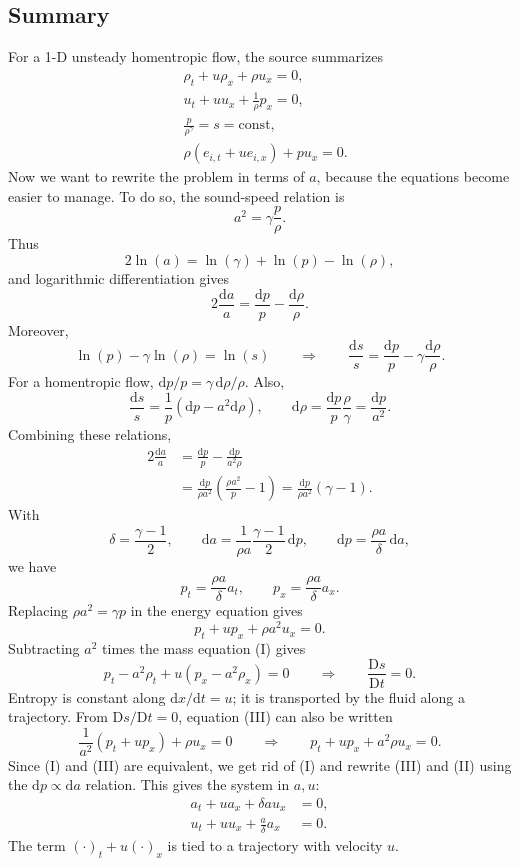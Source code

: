 \documentclass[11pt]{article}
\newcommand{\dd}{\mathrm{d}}
\begin{document}
\subsection*{Summary}
For a 1-D unsteady homentropic flow, the source summarizes
\[
\begin{aligned}
&\rho_t+u\rho_x+\rho u_x=0,\\
&u_t+u u_x+\frac{1}{\rho}p_x=0,\\
&\frac{p}{\rho^\gamma}=s=\mathrm{const},\\
&\rho(e_{i,t}+u e_{i,x})+p u_x=0.
\end{aligned}
\]
Now we want to rewrite the problem in terms of \(a\), because the equations
become easier to manage. To do so, the sound-speed relation is
\[
a^2=\gamma\frac{p}{\rho}.
\]
Thus
\[
2\ln(a)=\ln(\gamma)+\ln(p)-\ln(\rho),
\]
and logarithmic differentiation gives
\[
2\frac{\dd a}{a}=\frac{\dd p}{p}-\frac{\dd\rho}{\rho}.
\]
Moreover,
\[
\ln(p)-\gamma\ln(\rho)=\ln(s)
\qquad\Longrightarrow\qquad
\frac{\dd s}{s}=\frac{\dd p}{p}-\gamma\frac{\dd\rho}{\rho}.
\]
For a homentropic flow, \(\dd p/p=\gamma\,\dd\rho/\rho\).  Also,
\[
\frac{\dd s}{s}=\frac{1}{p}\left(\dd p-a^2\dd\rho\right),
\qquad
\dd\rho=\frac{\dd p}{p}\frac{\rho}{\gamma}
=\frac{\dd p}{a^2}.
\]
Combining these relations,
\[
\begin{aligned}
2\frac{\dd a}{a}
&=\frac{\dd p}{p}-\frac{\dd p}{a^2\rho}\\
&=\frac{\dd p}{\rho a^2}
\left(\frac{\rho a^2}{p}-1\right)
=\frac{\dd p}{\rho a^2}(\gamma-1).
\end{aligned}
\]
With
\[
\delta=\frac{\gamma-1}{2},
\qquad
\dd a=\frac{1}{\rho a}\frac{\gamma-1}{2}\,\dd p,
\qquad
\dd p=\frac{\rho a}{\delta}\,\dd a,
\]
we have
\[
p_t=\frac{\rho a}{\delta}a_t,\qquad
p_x=\frac{\rho a}{\delta}a_x.
\]
Replacing \(\rho a^2=\gamma p\) in the energy equation gives
\[
p_t+u p_x+\rho a^2u_x=0. \tag{III}
\]
Subtracting \(a^2\) times the mass equation (I) gives
\[
p_t-a^2\rho_t+u(p_x-a^2\rho_x)=0
\qquad\Longrightarrow\qquad
\frac{\mathrm{D}s}{\mathrm{D}t}=0.
\]
Entropy is constant along \(\dd x/\dd t=u\); it is transported by the fluid
along a trajectory.  From \(\mathrm{D}s/\mathrm{D}t=0\), equation (III) can
also be written
\[
\frac{1}{a^2}(p_t+u p_x)+\rho u_x=0
\qquad\Longrightarrow\qquad
p_t+u p_x+a^2\rho u_x=0. \tag{III}
\]
Since (I) and (III) are equivalent, we get rid of (I) and rewrite (III) and
(II) using the \(\dd p\propto\dd a\) relation. This gives the system in
\(a,u\):
\[
\boxed{
\begin{aligned}
a_t+u a_x+\delta a u_x&=0,\\
u_t+u u_x+\frac{a}{\delta}a_x&=0.
\end{aligned}}
\]
The term \((\cdot)_t+u(\cdot)_x\) is tied to a trajectory with velocity \(u\).
\end{document}
